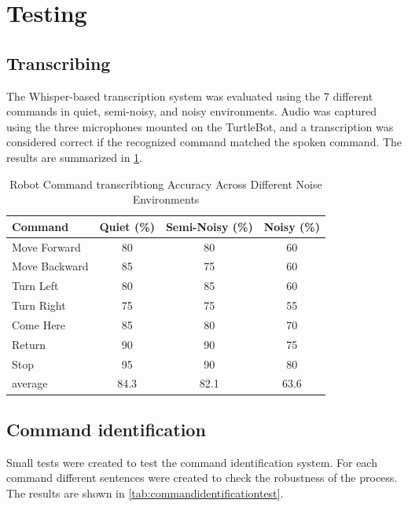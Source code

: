 \section{Testing}\label{sec:testing}

\subsection{Transcribing}
The Whisper-based transcription system was evaluated using the 7 different commands in quiet, semi-noisy, and noisy environments. Audio was captured using the three microphones mounted on the TurtleBot, and a transcription was considered correct if the recognized command matched the spoken command. The results are summarized in \cref{tab:command_accuracy_transcribe}.
\begin{table}[H]
    \centering
    \begin{tabular}{l | c c c}
        \toprule
        \textbf{Command} 
        & \textbf{Quiet (\%)} 
        & \textbf{Semi-Noisy (\%)} 
        & \textbf{Noisy (\%)} \\
        \midrule
        Move Forward   & 80 & 80 & 60 \\
        Move Backward  & 85 & 75 & 60 \\
        Turn Left      & 80 & 85 & 60 \\
        Turn Right     & 75 & 75 & 55 \\
        Come Here      & 85 & 80 & 70 \\
        Return         & 90 & 90 & 75 \\
        Stop           & 95 & 90 & 80 \\
        average         & 84.3 & 82.1 & 63.6 \\       
        \bottomrule
    \end{tabular}
    \caption{Robot Command transcribtiong Accuracy Across Different Noise Environments}
    \label{tab:command_accuracy_transcribe}
\end{table}



\subsection{Command identification}
Small tests were created to test the command identification system. For each command different sentences were created to check the robustness of the process. The results are shown in \cref{tab:commandidentificationtest}.

